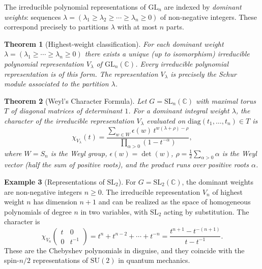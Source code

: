 \documentclass[12pt,a4paper]{amsart}
\newtheorem{theorem}{Theorem}[section]
\theoremstyle{definition}
\newtheorem{example}[theorem]{Example}
\begin{document}
The irreducible polynomial representations of $\mathrm{GL}_n$ are indexed by
\emph{dominant weights}: sequences $\lambda = (\lambda_1 \geq \lambda_2 \geq
\cdots \geq \lambda_n \geq 0)$ of non-negative integers.  These correspond
precisely to partitions $\lambda$ with at most $n$ parts.

\begin{theorem}[Highest-weight classification]
\label{thm:hwt}
For each dominant weight $\lambda = (\lambda_1 \geq \cdots \geq \lambda_n \geq 0)$
there exists a unique (up to isomorphism) irreducible polynomial representation
$V_\lambda$ of $\mathrm{GL}_n(\mathbb{C})$.  Every irreducible polynomial
representation is of this form.  The representation $V_\lambda$ is precisely the
Schur module associated to the partition $\lambda$.
\end{theorem}

\begin{theorem}[Weyl's Character Formula]
\label{thm:weyl_char}
Let $G = \mathrm{SL}_n(\mathbb{C})$ with maximal torus $T$ of diagonal matrices
of determinant $1$.  For a dominant integral weight $\lambda$, the character of
the irreducible representation $V_\lambda$ evaluated on $\mathrm{diag}(t_1,\ldots,t_n)
\in T$ is
\[
    \chi_{V_\lambda}(t) = \frac{\sum_{w \in W} \epsilon(w)\, t^{w(\lambda+\rho)-\rho}}{\prod_{\alpha > 0}(1 - t^{-\alpha})},
\]
where $W = S_n$ is the Weyl group, $\epsilon(w) = \det(w)$, $\rho =
\tfrac{1}{2}\sum_{\alpha > 0}\alpha$ is the Weyl vector (half the sum of positive
roots), and the product runs over positive roots $\alpha$.
\end{theorem}

\begin{example}[Representations of $\mathrm{SL}_2$]
For $G = \mathrm{SL}_2(\mathbb{C})$, the dominant weights are non-negative
integers $n \geq 0$.  The irreducible representation $V_n$ of highest weight $n$
has dimension $n+1$ and can be realized as the space of homogeneous polynomials
of degree $n$ in two variables, with $\mathrm{SL}_2$ acting by substitution.
The character is
\[
    \chi_{V_n}\!\left(\begin{smallmatrix}t & 0 \\ 0 & t^{-1}\end{smallmatrix}\right)
    = t^n + t^{n-2} + \cdots + t^{-n} = \frac{t^{n+1} - t^{-(n+1)}}{t - t^{-1}}.
\]
These are the Chebyshev polynomials in disguise, and they coincide with the
spin-$n/2$ representations of $\mathrm{SU}(2)$ in quantum mechanics.
\end{example}
\end{document}
